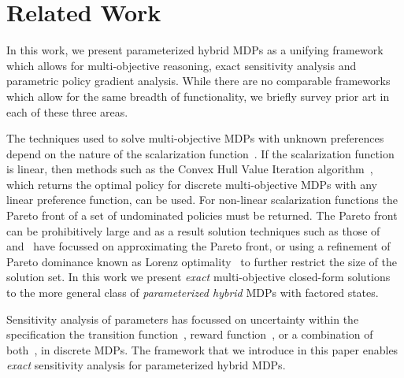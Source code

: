 \section{Related Work}
\label{sec:background}


In this work, we present parameterized hybrid MDPs as a unifying framework which allows for multi-objective reasoning, exact sensitivity analysis and parametric policy gradient analysis. While there are no comparable frameworks which allow for the same breadth of functionality, we briefly survey prior art in each of these three areas.

The techniques used to solve multi-objective MDPs with unknown preferences depend on the nature of the scalarization function~\parencite{Roijers_JAIR_2013}. If the scalarization function is linear, then methods such as the Convex Hull Value Iteration algorithm~\parencite{Barrett_ICML_2008}, which returns the optimal policy for discrete multi-objective MDPs with any linear preference function, can be used. For non-linear scalarization functions the Pareto front of a set of undominated policies must be returned. The Pareto front can be prohibitively large and as a result solution techniques such as those of~\parencite{Chatterjee_STACS_2006} and~\parencite{Pirotta_AAAI_2015} have focussed on approximating the Pareto front, or using a refinement of Pareto dominance known as Lorenz optimality~\parencite{Perny_AAAI_2013} to further restrict the size of the solution set. In this work we present \textit{exact} multi-objective closed-form solutions to the more general class of \textit{parameterized hybrid} MDPs with factored states. 

Sensitivity analysis of parameters has focussed on uncertainty within the specification the transition function~\parencite{Kalyanasundaram_AJC_2004}, reward function~\parencite{Tan_JAP_2011, Hopp_JOTA_1988}, or a combination of both~\parencite{Givan_AI_2000}, in discrete MDPs. The framework that we introduce in this paper enables \textit{exact} sensitivity analysis for parameterized hybrid MDPs.

